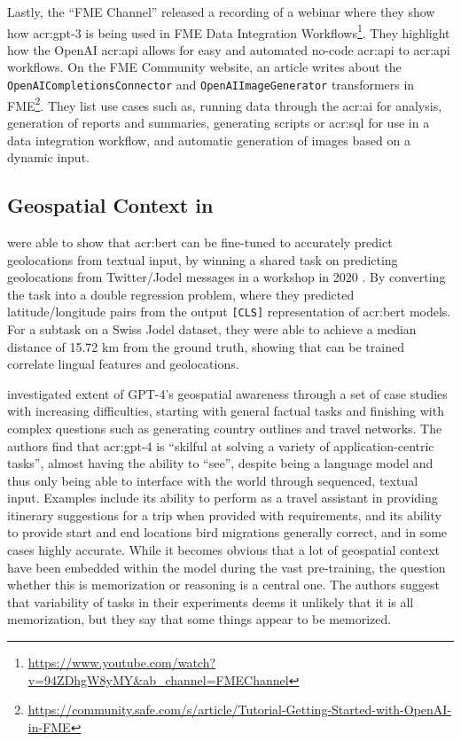 Lastly, the \enquote{FME Channel} released a recording of a webinar where they show how \acrshort{acr:gpt}-3 is being used in FME Data Integration Workflows\footnote{\url{https://www.youtube.com/watch?v=94ZDhgW8yMY&ab_channel=FMEChannel}}. They highlight how the OpenAI \acrshort{acr:api} allows for easy and automated no-code \acrshort{acr:api} to \acrshort{acr:api} workflows. On the FME Community website, an article writes about the \texttt{OpenAICompletionsConnector} and \texttt{OpenAIImageGenerator} transformers in FME\footnote{\url{https://community.safe.com/s/article/Tutorial-Getting-Started-with-OpenAI-in-FME}}. They list use cases such as, running data through the \acrshort{acr:ai} for analysis, generation of reports and summaries, generating scripts or \acrshort{acr:sql} for use in a data integration workflow, and automatic generation of images based on a dynamic input.



\subsection[Geospatial Context in LLMs]{Geospatial Context in }

\cite{scherrerHeLjuVarDial20202020} were able to show that \acrshort{acr:bert} can be fine-tuned to accurately predict geolocations from textual input, by winning a shared task on predicting geolocations from Twitter/Jodel messages in a workshop in 2020 \citep{gamanReportVarDialEvaluation2020}. By converting the task into a double regression problem, where they predicted latitude/longitude pairs from the output \texttt{[CLS]} representation of \acrshort{acr:bert} models. For a subtask on a Swiss Jodel dataset, they were able to achieve a median distance of 15.72 km from the ground truth, showing that  can be trained correlate lingual features and geolocations.

\cite{robertsGPT4GEOHowLanguage2023} investigated extent of GPT-4's geospatial awareness through a set of case studies with increasing difficulties, starting with general factual tasks and finishing with complex questions such as generating country outlines and travel networks. The authors find that \acrshort{acr:gpt}-4 is \enquote{skilful at solving a variety of application-centric tasks}, almost having the ability to \enquote{see}, despite being a language model and thus only being able to interface with the world through sequenced, textual input. Examples include its ability to perform as a travel assistant in providing itinerary suggestions for a trip when provided with requirements, and its ability to provide start and end locations bird migrations generally correct, and in some cases highly accurate. While it becomes obvious that a lot of geospatial context have been embedded within the model during the vast pre-training, the question whether this is memorization or reasoning is a central one. The authors suggest that variability of tasks in their experiments deems it unlikely that it is all memorization, but they say that some things appear to be memorized.

